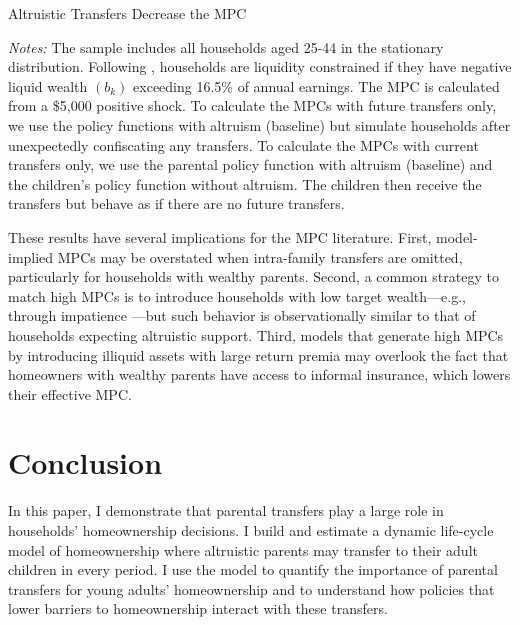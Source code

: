 \documentclass[12pt]{article}
\begin{document}
\begin{table}[tb]
	\center\singlespacing	
	\begin{threeparttable}[tb]
		\caption{Altruistic Transfers Decrease the MPC}
		
	\end{threeparttable}
	{\begin{footnotesize}\begin{flushleft}\vspace{-0.1in}
		\textit{Notes:} The sample includes all households aged 25-44 in the stationary distribution. Following \cite{Kaplan2014}, households are liquidity constrained if they have negative liquid wealth $(b_k)$ exceeding 16.5\% of annual earnings. The MPC is calculated from a \$5,000 positive shock. To calculate the MPCs with future transfers only, we use the policy functions with altruism (baseline) but simulate households after unexpectedly confiscating any transfers. To calculate the MPCs with current transfers only, we use the parental policy function with altruism (baseline) and the children’s policy function without altruism. The children then receive the transfers but behave as if there are no future transfers. \end{flushleft}\end{footnotesize}}			
\end{table}

These results have several implications for the MPC literature. First, model-implied MPCs may be overstated when intra-family transfers are omitted, particularly for households with wealthy parents. Second, a common strategy to match high MPCs is to introduce households with low target wealth—e.g., through impatience \citep{aguiar2024hand}—but such behavior is observationally similar to that of households expecting altruistic support. Third, models that generate high MPCs by introducing illiquid assets with large return premia \citep{kaplan2022marginal} may overlook the fact that homeowners with wealthy parents have access to informal insurance, which lowers their effective MPC. 

\section{Conclusion}
In this paper, I demonstrate that parental transfers play a large role in households' homeownership decisions. I build and estimate a dynamic life-cycle model of homeownership where altruistic parents may transfer to their adult children in every period. I use the model to quantify the importance of parental transfers for young adults' homeownership and to understand how policies that lower barriers to homeownership interact with these transfers.
\end{document}
